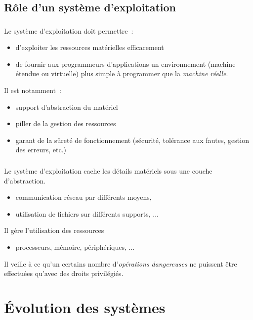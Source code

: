 \subsection{Rôle d’un système d’exploitation}
\begin{frame}
\frametitle{\insertsubsection}

Le système d'exploitation doit permettre~:
\begin{itemize}
\item d'\alert{exploiter les ressources matérielles} efficacement
\item de fournir aux programmeurs d'applications un \alert{environnement}
  (\alert{machine étendue} ou \alert{virtuelle}) plus simple à programmer que la
  \emph{machine réelle}.
\end{itemize}
\vspace{0.5cm}

Il est notamment~: 
\begin{itemize}
\item support d'abstraction du matériel
\item piller de la gestion des ressources
\item garant de la sûreté de fonctionnement (sécurité, tolérance aux
  fautes, gestion des erreurs, etc.)
\end{itemize}
\end{frame}

\begin{frame}
  \frametitle{\insertsubsection} 
  Le système d'exploitation \alert{cache les détails matériels} 
  sous une \alert{couche d'abstraction.}
  \begin{itemize}
  \item communication réseau par différents moyens,
  \item utilisation de fichiers sur différents supports, ...
  \end{itemize}
  \vspace{0.5cm}
  Il gère l'utilisation des ressources  
  \begin{itemize}
  \item processeurs, mémoire, périphériques, ...
  \end{itemize}
  \vspace{0.5cm}
  Il veille à ce qu'un certains nombre d'\emph{opérations dangereuses} ne puissent
  être effectuées qu'avec des droits privilégiés.  
  \end{frame}

\section{Évolution des systèmes}

